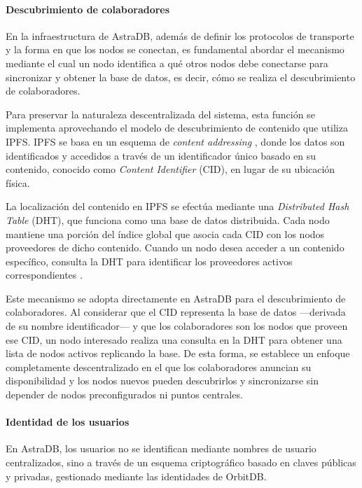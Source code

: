 \paragraph{Descubrimiento de colaboradores}

En la infraestructura de AstraDB, además de definir los protocolos de transporte y la forma en que los nodos se conectan, es fundamental abordar el mecanismo mediante el cual un nodo identifica a qué otros nodos debe conectarse para sincronizar y obtener la base de datos, es decir, cómo se realiza el descubrimiento de colaboradores.

Para preservar la naturaleza descentralizada del sistema, esta función se implementa aprovechando el modelo de descubrimiento de contenido que utiliza IPFS. IPFS se basa en un esquema de \textit{content addressing} \cite{content-addressing}, donde los datos son identificados y accedidos a través de un identificador único basado en su contenido, conocido como \textit{Content Identifier} (CID), en lugar de su ubicación física.

La localización del contenido en IPFS se efectúa mediante una \textit{Distributed Hash Table} (DHT), que funciona como una base de datos distribuida. Cada nodo mantiene una porción del índice global que asocia cada CID con los nodos proveedores de dicho contenido. Cuando un nodo desea acceder a un contenido específico, consulta la DHT para identificar los proveedores activos correspondientes \cite{dht}.

Este mecanismo se adopta directamente en AstraDB para el descubrimiento de colaboradores. Al considerar que el CID representa la base de datos —derivada de su nombre identificador— y que los colaboradores son los nodos que proveen ese CID, un nodo interesado realiza una consulta en la DHT para obtener una lista de nodos activos replicando la base. De esta forma, se establece un enfoque completamente descentralizado en el que los colaboradores anuncian su disponibilidad y los nodos nuevos pueden descubrirlos y sincronizarse sin depender de nodos preconfigurados ni puntos centrales.

\paragraph{Identidad de los usuarios}

En AstraDB, los usuarios no se identifican mediante nombres de usuario centralizados, sino a través de un esquema criptográfico basado en claves públicas y privadas, gestionado mediante las identidades de OrbitDB.

